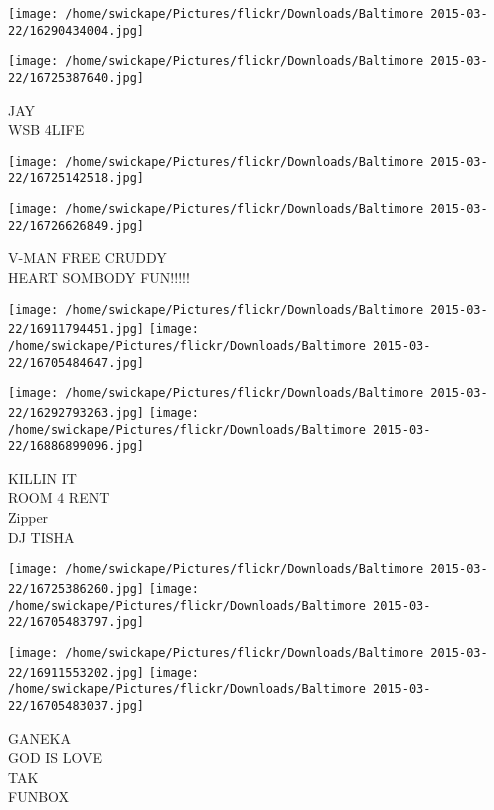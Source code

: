 \documentclass[10pt,letterpaper]{article}
\begin{document}
\texttt{[image: /home/swickape/Pictures/flickr/Downloads/Baltimore 2015-03-22/16290434004.jpg]}

\vspace{0.25in}
\texttt{[image: /home/swickape/Pictures/flickr/Downloads/Baltimore 2015-03-22/16725387640.jpg]}

JAY\\
WSB 4LIFE\\
\pagebreak

\texttt{[image: /home/swickape/Pictures/flickr/Downloads/Baltimore 2015-03-22/16725142518.jpg]}

\vspace{0.25in}
\texttt{[image: /home/swickape/Pictures/flickr/Downloads/Baltimore 2015-03-22/16726626849.jpg]}

V{-}MAN FREE CRUDDY\\
HEART SOMBODY FUN!!!!!\\
\pagebreak

\texttt{[image: /home/swickape/Pictures/flickr/Downloads/Baltimore 2015-03-22/16911794451.jpg]}
\texttt{[image: /home/swickape/Pictures/flickr/Downloads/Baltimore 2015-03-22/16705484647.jpg]}

\texttt{[image: /home/swickape/Pictures/flickr/Downloads/Baltimore 2015-03-22/16292793263.jpg]}
\texttt{[image: /home/swickape/Pictures/flickr/Downloads/Baltimore 2015-03-22/16886899096.jpg]}

KILLIN IT\\
ROOM 4 RENT\\
Zipper\\
DJ TISHA\\
\pagebreak

\texttt{[image: /home/swickape/Pictures/flickr/Downloads/Baltimore 2015-03-22/16725386260.jpg]}
\texttt{[image: /home/swickape/Pictures/flickr/Downloads/Baltimore 2015-03-22/16705483797.jpg]}

\texttt{[image: /home/swickape/Pictures/flickr/Downloads/Baltimore 2015-03-22/16911553202.jpg]}
\texttt{[image: /home/swickape/Pictures/flickr/Downloads/Baltimore 2015-03-22/16705483037.jpg]}

GANEKA\\
GOD IS LOVE\\
TAK\\
FUNBOX\\
\pagebreak
\end{document}

